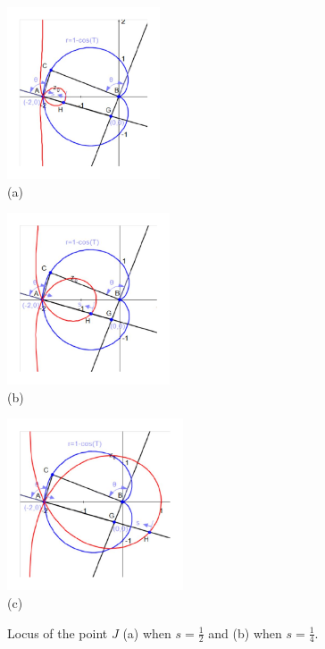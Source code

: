 \documentclass[12pt,a4paper]{article}%
\begin{document}
\begin{figure}[htpb]
\begin{center}
\parbox[b]{1.9in}{\begin{center}
\includegraphics[height=2.0in,keepaspectratio]{PJH75I1Q.pdf}
 \\ (a)
\end{center}}
\qquad
\parbox[b]{1.7in}{\begin{center}
\includegraphics[height=2.0in,keepaspectratio]{PJH75I1R.pdf}
 \\ (b)
\end{center}}
\qquad
\parbox[b]{1.7in}{\begin{center}
\includegraphics[height=2.0in,keepaspectratio]{PJH75I1S.pdf}
 \\ (c)
\end{center}}
\end{center}
\caption{Locus of the point $J$ (a) when $s=\frac{1}{2}$ and (b) when $s=\frac{1}{4}$.}
\label{fig14}
\end{figure}
\end{document}
